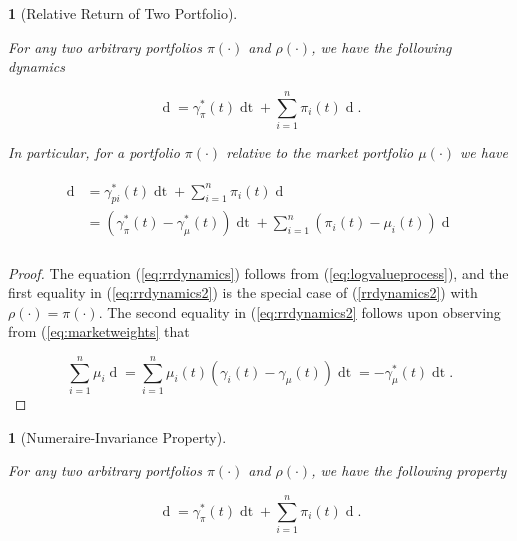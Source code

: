 \documentclass[british]{amsart}
\numberwithin{equation}{section}
\numberwithin{figure}{section}
\theoremstyle{plain}
\theoremstyle{definition}
\theoremstyle{plain}
\theoremstyle{plain}
\newtheorem{lem}[thm]{\protect\lemmaname}
\theoremstyle{plain}
\theoremstyle{remark}
\theoremstyle{plain}
\providecommand{\lemmaname}{Lemma}
\renewcommand{\d}[1]{\mathop{\mathrm{d}{#1}}}
\begin{document}
\begin{lem} [Relative Return of Two Portfolio]
	\label{lem:relativereturnoftwoportfolios}

	For any two arbitrary portfolios $\pi(\cdot)$ and $\rho(\cdot)$, we have the following dynamics

	\begin{equation}
		\label{eq:rrdynamics}
		\d{ \log{ \left( \frac{ V^{\pi}(t) }{ V^{\rho}(t) } \right) } } =
			\gamma_{\pi}^{*}(t)\d{t} + 
			\sum_{i=1}^{n} \pi_{i}(t) \d{ \log{ \left( \frac{ X_{i}(t) }{ V^{\rho}(t)} \right) }}.
	\end{equation}

	In particular, for a portfolio $\pi(\cdot)$ relative to the market portfolio $\mu(\cdot)$ we have

	\begin{gather*}
		\label{eq:rrdynamics2}
		\begin{split}	
			\d{ \log{ \left( \frac{ V^(t) }{ V^{\mu}(t) } \right) } } &=
				\gamma_{pi}^{*}(t)\d{t} + 
				\sum_{i=1}^{n} \pi_{i}(t)  \d{ \log{\mu_{i}(t)} } \\
			&=
				(\gamma_{\pi}^{*}(t) - \gamma_{\mu}^{*}(t)) \d{t} + 
				\sum_{i=1}^{n} (\pi_{i}(t) - \mu_{i}(t)) \d{ \log{\mu_{i}(t)} } \\
		\end{split}
	\end{gather*}

\end{lem}

\begin{proof}

	The equation (\ref{eq:rrdynamics}) follows from (\ref{eq:logvalueprocess}), and the first equality in (\ref{eq:rrdynamics2}) is the special case of (\ref{rrdynamics2}) with $\rho(\cdot) = \pi(\cdot)$. The second equality in (\ref{eq:rrdynamics2} follows upon observing from (\ref{eq:marketweights} that

	\begin{equation*}
		\sum_{i=1}^{n} \mu_{i}\d{\log{\mu_{i}(t)}} =
			\sum_{i=1}^{n} \mu_{i}(t)(\gamma_{i}(t)-\gamma_{\mu}(t))\d{t} =
			-\gamma_{\mu}^{*}(t)\d{t}.
	\end{equation*}

\end{proof}

\begin{lem} [Numeraire-Invariance Property]
	\label{lem:relativereturnoftwoportfolios}

	For any two arbitrary portfolios $\pi(\cdot)$ and $\rho(\cdot)$, we have the following property 

	\begin{equation*}
		\d{ \log{ \left( \frac{ V^{\pi}(t) }{ V^{\rho}(t) } \right) } } =
			\gamma_{\pi}^{*}(t)\d{t} + 
			\sum_{i=1}^{n} \pi_{i}(t) \d{ \log{ \left( \frac{ X_{i}(t) }{ V^{\rho}(t)} \right) }}.
	\end{equation*}

	
\end{lem}
\end{document}
